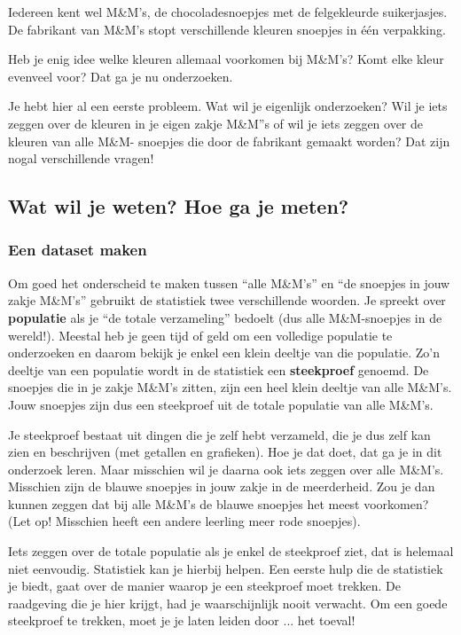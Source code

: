 \documentclass[11pt]{article}
\begin{document}
Iedereen kent wel M\&M’s, de chocoladesnoepjes met de felgekleurde suikerjasjes. De fabrikant van
M\&M’s stopt verschillende kleuren snoepjes in één verpakking.

Heb je enig idee welke kleuren allemaal voorkomen bij M\&M’s?
Komt elke kleur evenveel voor? Dat ga je nu onderzoeken.

Je hebt hier al een eerste probleem. Wat wil je eigenlijk
onderzoeken? Wil je iets zeggen over de kleuren in je eigen zakje
M\&M”s of wil je iets zeggen over de kleuren van alle M\&M-
snoepjes die door de fabrikant gemaakt worden? Dat zijn nogal
verschillende vragen!

\subsection{Wat wil je weten? Hoe ga je meten?}

\subsubsection{Een dataset maken}

Om goed het onderscheid te maken tussen “alle M\&M’s” en “de snoepjes in jouw zakje M\&M’s”
gebruikt de statistiek twee verschillende woorden. Je spreekt over {\bf populatie} als je “de totale
verzameling” bedoelt (dus alle M\&M-snoepjes in de wereld!). Meestal heb je geen tijd of geld om een volledige
populatie te onderzoeken en daarom bekijk je enkel een klein deeltje van die populatie. Zo’n deeltje
van een populatie wordt in de statistiek een {\bf steekproef} genoemd. De snoepjes die in je zakje
M\&M’s zitten, zijn een heel klein deeltje van alle M\&M’s. Jouw snoepjes zijn dus een steekproef uit
de totale populatie van alle M\&M’s.

Je steekproef bestaat uit dingen die je zelf hebt verzameld, die je dus zelf kan zien en beschrijven
(met getallen en grafieken). Hoe je dat doet, dat ga je in dit onderzoek leren. Maar misschien wil je
daarna ook iets zeggen over alle M\&M’s. Misschien zijn de blauwe snoepjes in jouw zakje in de
meerderheid. Zou je dan kunnen zeggen dat bij alle M\&M’s de blauwe snoepjes het meest
voorkomen? (Let op! Misschien heeft een andere leerling meer rode snoepjes).

Iets zeggen over de totale populatie als je enkel de steekproef ziet, dat is helemaal niet eenvoudig.
Statistiek kan je hierbij helpen. Een eerste hulp die de statistiek je biedt, gaat over de manier waarop
je een steekproef moet trekken. De raadgeving die je hier krijgt, had je waarschijnlijk nooit
verwacht. Om een goede steekproef te trekken, moet je je laten leiden door ... het toeval!
\end{document}
